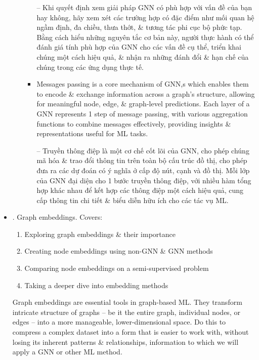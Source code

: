 \documentclass{article}
\begin{document}
\begin{itemize}
\begin{itemize}
\begin{itemize}
            -- Khi quyết định xem giải pháp GNN có phù hợp với vấn đề của bạn hay không, hãy xem xét các trường hợp có đặc điểm như mối quan hệ ngầm định, đa chiều, thưa thớt, \& tương tác phi cục bộ phức tạp. Bằng cách hiểu những nguyên tắc cơ bản này, người thực hành có thể đánh giá tính phù hợp của GNN cho các vấn đề cụ thể, triển khai chúng một cách hiệu quả, \& nhận ra những đánh đổi \& hạn chế của chúng trong các ứng dụng thực tế.
            \item Messages passing is a core mechanism of GNN,s which enables them to encode \& exchange information across a graph's structure, allowing for meaningful node, edge, \& graph-level predictions. Each layer of a GNN represents 1 step of message passing, with various aggregation functions to combine messages effectively, providing insights \& representations useful for ML tasks.

            -- Truyền thông điệp là một cơ chế cốt lõi của GNN, cho phép chúng mã hóa \& trao đổi thông tin trên toàn bộ cấu trúc đồ thị, cho phép đưa ra các dự đoán có ý nghĩa ở cấp độ nút, cạnh và đồ thị. Mỗi lớp của GNN đại diện cho 1 bước truyền thông điệp, với nhiều hàm tổng hợp khác nhau để kết hợp các thông điệp một cách hiệu quả, cung cấp thông tin chi tiết \& biểu diễn hữu ích cho các tác vụ ML.
        \end{itemize}
    \end{itemize}
    \item {. Graph embeddings.} Covers:
    \begin{enumerate}
        \item Exploring graph embeddings \& their importance
        \item Creating node embeddings using non-GNN \& GNN methods
        \item Comparing node embeddings on a semi-supervised problem
        \item Taking a deeper dive into embedding methods
    \end{enumerate}
    Graph embeddings are essential tools in graph-based ML. They transform intricate structure of graphs -- be it the entire graph, individual nodes, or edges -- into a more manageable, lower-dimensional space. Do this to compress a complex dataset into a form that is easier to work with, without losing its inherent patterns \& relationships, information to which we will apply a GNN or other ML method.


\end{itemize}
\end{document}
